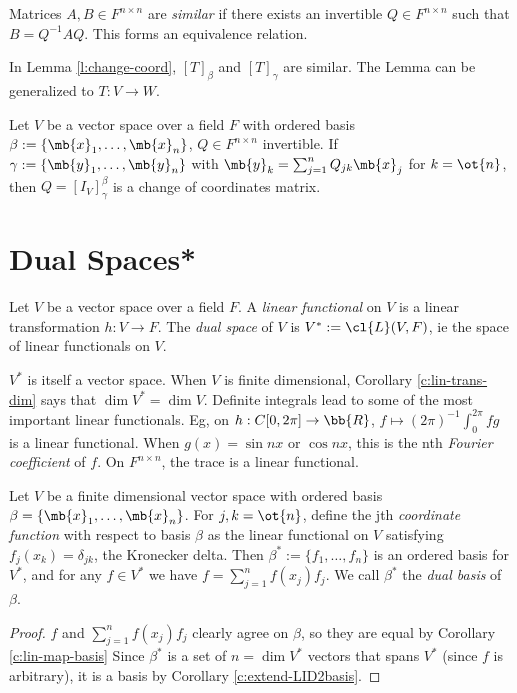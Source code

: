 \begin{defn}
Matrices $A,B \in F^{n \times n}$ are \emph{similar} if there exists an invertible $Q \in F^{n \times n}$ such that $B=Q^{-1}AQ$. This forms an equivalence relation.
\end{defn}
In Lemma \ref{l:change-coord}, $[T]_\beta$ and $[T]_\gamma$ are similar. The Lemma can be generalized to $T:V \to W$.
\begin{exer}
Let $V$ be a vector space over a field $F$ with ordered basis $\beta:= \{ \mb{x}_1, \ldots, \mb{x}_n \}$, $Q \in F^{n \times n}$ invertible. If $\gamma:= \{ \mb{y}_1, \ldots, \mb{y}_n \}$ with $\mb{y}_k= \sum_{j=1}^nQ_{jk}\mb{x}_j$ for $k=\ot{n}$, then $Q=[I_V]_\gamma^\beta$ is a change of coordinates matrix. 
\end{exer}

\section{Dual Spaces*}
\begin{defn}
Let $V$ be a vector space over a field $F$. A \emph{linear functional} on $V$ is a linear transformation $h:V \to F$. The \emph{dual space} of $V$ is $V^*:= \cl{L}(V,F)$, ie the space of linear functionals on $V$.
\end{defn}
$V^*$ is itself a vector space. When $V$ is finite dimensional, Corollary \ref{c:lin-trans-dim} says that $\dim V^*= \dim V$.
Definite integrals lead to some of the most important linear functionals. Eg, on $h:C[0,2 \pi] \to \bb{R}$, $f \mapsto (2 \pi)^{-1}\int_0^{2 \pi}fg$ is a linear functional. When $g(x)= \sin nx$ or $\cos nx$, this is the nth \emph{Fourier coefficient} of $f$. On $F^{n \times n}$, the trace is a linear functional. 
\begin{lem}\label{l:dual-basis}
Let $V$ be a finite dimensional vector space with ordered basis $\beta= \{ \mb{x}_1, \ldots,\mb{x}_n \}$. For $j,k=\ot{n}$, define the jth \emph{coordinate function} with respect to basis $\beta$ as the linear functional on $V$ satisfying $f_j(x_k)= \delta_{jk}$, the Kronecker delta.
Then $\beta^*:= \{ f_1, \ldots,f_n \}$ is an ordered basis for $V^*$, and for any $f \in V^*$ we have $f= \sum_{j=1}^nf(x_j)f_j$. We call $\beta^*$ the \emph{dual basis} of $\beta$.
\end{lem}
\begin{proof}%
$f$ and $\sum_{j=1}^nf(x_j)f_j$ clearly agree on $\beta$, so they are equal by Corollary \ref{c:lin-map-basis} 
Since $\beta^*$ is a set of $n= \dim V^*$ vectors that spans $V^*$ (since $f$ is arbitrary), it is a basis by Corollary \ref{c:extend-LID2basis}.
\end{proof}
